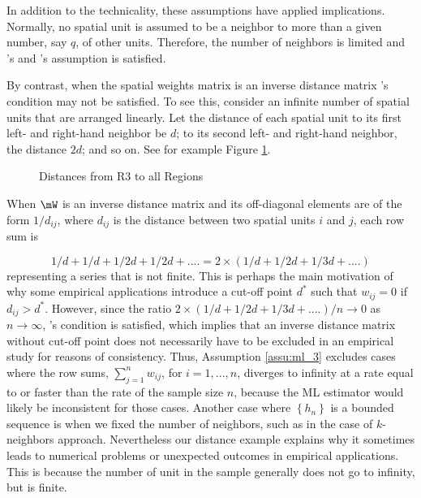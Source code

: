 In addition to the technicality, these assumptions have applied implications. Normally, no spatial unit is assumed to be a neighbor to more than a given number, say $q$, of other units. Therefore, the number of neighbors is limited and \cite{lee2004asymptotic}'s and  \cite{kelejian1998generalized, kelejian1999generalized}'s assumption is satisfied. 

By contrast, when the spatial weights matrix is an inverse distance matrix \cite{kelejian1998generalized, kelejian1999generalized}'s condition may not be satisfied. To see this, consider an infinite number of spatial units that are arranged linearly. Let the distance of each spatial unit to its first left- and right-hand neighbor be $d$; to its second left- and right-hand neighbor, the distance $2d$; and so on. See for example Figure \ref{fig:example_lineal}.

\begin{figure}[h]
\caption{Distances from R3 to all Regions}
\label{fig:example_lineal}
\centering
{}
\end{figure}


When $\mW$ is an inverse distance matrix and its off-diagonal elements are of the form $1/d_{ij}$, where $d_{ij}$ is the distance between two spatial units $i$ and $j$, each row sum is

\begin{equation*}
  1/d + 1/d + 1/2d + 1/2d + .... = 2 \times (1/d + 1/2d + 1/3d + ....) 
\end{equation*}
%
representing a series that is not finite. This is perhaps the main motivation of why some empirical applications introduce a cut-off point $d^*$ such that $w_{ij}=0$ if $d_{ij}>d^*$. However, since the ratio $2 \times (1/d + 1/2d + 1/3d + ....)/ n \to 0$ as $n\to \infty$,  \cite{lee2004asymptotic}'s condition is satisfied, which implies that an inverse distance matrix without cut-off point does not necessarily have to be excluded in an empirical study for reasons of consistency. Thus, Assumption \ref{assu:ml_3} excludes cases where the row sums, $\sum_{j = 1}^n w_{ij}$, for $i = 1,...,n$, diverges to infinity at a rate equal to or faster than the rate of the sample size $n$, because the ML estimator would likely be inconsistent for those cases. Another case where $\left\lbrace h_n \right\rbrace$ is a bounded sequence is when we fixed the number of neighbors, such as in the case of $k$-neighbors approach. Nevertheless our distance example explains why it sometimes leads to numerical problems or unexpected outcomes in empirical applications. This is because the number of unit in the sample generally does not go to infinity, but is finite. 



